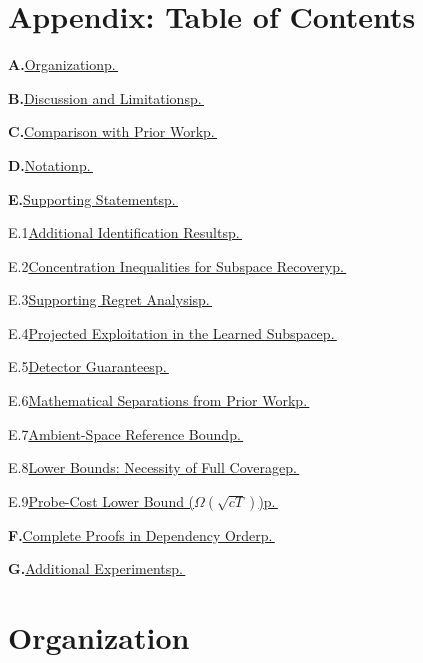 \documentclass{article}
\begin{document}
\newpage
\appendix

  \section*{Appendix: Table of Contents}
  \label{app:toc}

  \begingroup
  \hypersetup{linkcolor=blue}

  \newcommand{\tocentry}[3]{%
    \noindent\textbf{#1.}\;\hyperref[#2]{#3}\dotfill\hyperref[#2]{p.\,\pageref*{#2}}\par\vspace{2pt}%
  }
  \newcommand{\tocsubentry}[3]{%
    \noindent\hspace{1.2em}#1\;\hyperref[#2]{#3}\dotfill\hyperref[#2]{p.\,\pageref*{#2}}\par\vspace{1pt}%
  }

  \tocentry{A}{sec:organization}{Organization}
  \tocentry{B}{sec:discussion}{Discussion and Limitations}
  \tocentry{C}{app:related_table}{Comparison with Prior Work}
  \tocentry{D}{app:notation}{Notation}
  \tocentry{E}{app:supporting_statements}{Supporting Statements}
    \tocsubentry{E.1}{app:omitted_identification}{Additional Identification Results}
    \tocsubentry{E.2}{app:concentration}{Concentration Inequalities for Subspace Recovery}
    \tocsubentry{E.3}{app:supporting_regret}{Supporting Regret Analysis}
    \tocsubentry{E.4}{app:projected_exploitation}{Projected Exploitation in the Learned Subspace}
    \tocsubentry{E.5}{app:detector_guarantees}{Detector Guarantees}
    \tocsubentry{E.6}{app:separation}{Mathematical Separations from Prior Work}
    \tocsubentry{E.7}{app:ambient_reference}{Ambient-Space Reference Bound}
    \tocsubentry{E.8}{app:coverage_lower_bound}{Lower Bounds: Necessity of Full Coverage}
    \tocsubentry{E.9}{app:probe_cost_lower_bound}{Probe-Cost Lower Bound ($\Omega(\sqrt{cT})$)}
  \tocentry{F}{app:all_proofs}{Complete Proofs in Dependency Order}
  \tocentry{G}{app:additional_experiments}{Additional Experiments}


  \endgroup

\section{Organization}
\label{sec:organization}
\end{document}
